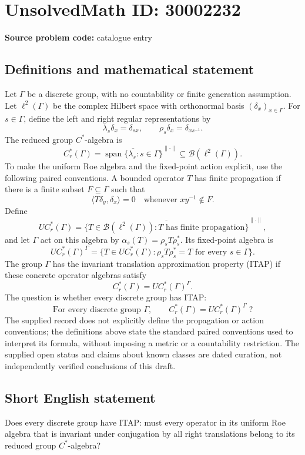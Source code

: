 \documentclass[11pt]{article}
\begin{document}
\section*{UnsolvedMath ID: 30002232}
\textbf{Source problem code:} catalogue entry
\subsection{Definitions and mathematical statement}
Let \(\Gamma\) be a discrete group, with no countability or finite generation assumption. Let \(\ell^2(\Gamma)\) be the complex Hilbert space with orthonormal basis \((\delta_x)_{x\in\Gamma}\). For \(s\in\Gamma\), define the left and right regular representations by
\[
\lambda_s\delta_x=\delta_{sx},\qquad \rho_s\delta_x=\delta_{xs^{-1}}.
\]
The reduced group \(C^*\)-algebra is
\[
C_r^*(\Gamma)=\overline{\operatorname{span}\{\lambda_s:s\in\Gamma\}}^{\|\cdot\|}\subseteq\mathcal B(\ell^2(\Gamma)).
\]
To make the uniform Roe algebra and the fixed-point action explicit, use the following paired conventions. A bounded operator \(T\) has finite propagation if there is a finite subset \(F\subseteq\Gamma\) such that
\[
\langle T\delta_y,\delta_x\rangle=0\quad\text{whenever }xy^{-1}\notin F.
\]
Define
\[
UC_r^*(\Gamma)=\overline{\{T\in\mathcal B(\ell^2(\Gamma)):T\text{ has finite propagation}\}}^{\|\cdot\|},
\]
and let \(\Gamma\) act on this algebra by \(\alpha_s(T)=\rho_sT\rho_s^*\). Its fixed-point algebra is
\[
UC_r^*(\Gamma)^\Gamma=\{T\in UC_r^*(\Gamma):\rho_sT\rho_s^*=T\text{ for every }s\in\Gamma\}.
\]
The group \(\Gamma\) has the invariant translation approximation property (ITAP) if these concrete operator algebras satisfy
\[
C_r^*(\Gamma)=UC_r^*(\Gamma)^\Gamma.
\]
The question is whether every discrete group has ITAP:
\[
\text{For every discrete group }\Gamma,\qquad C_r^*(\Gamma)=UC_r^*(\Gamma)^\Gamma\;?
\]
The supplied record does not explicitly define the propagation or action conventions; the definitions above state the standard paired conventions used to interpret its formula, without imposing a metric or a countability restriction. The supplied open status and claims about known classes are dated curation, not independently verified conclusions of this draft.
\subsection{Short English statement}
Does every discrete group have ITAP: must every operator in its uniform Roe algebra that is invariant under conjugation by all right translations belong to its reduced group \(C^*\)-algebra?
\end{document}
